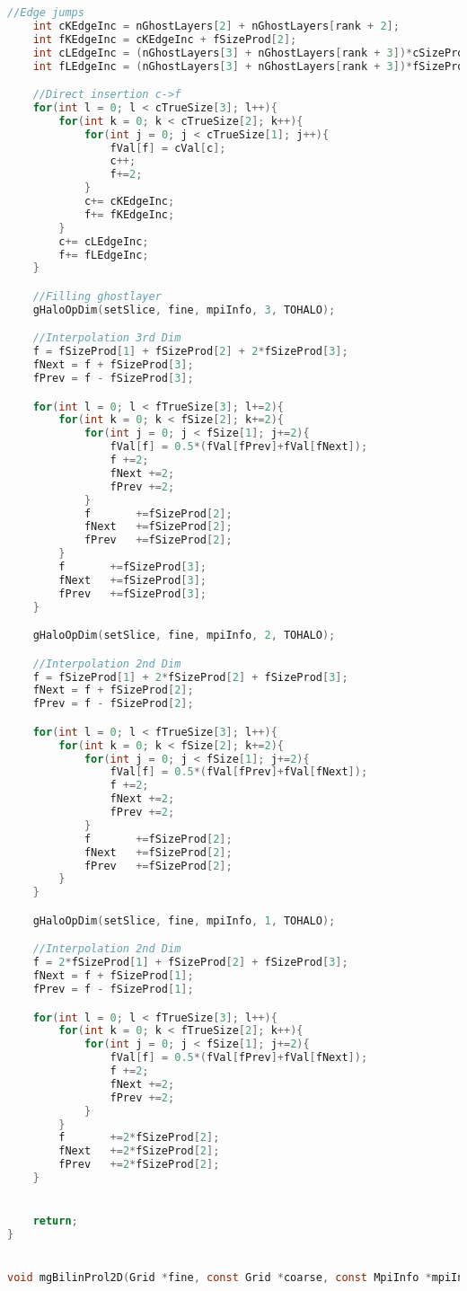 \begin{lstlisting}[language=c, caption = main routine]
	//Edge jumps
	int cKEdgeInc = nGhostLayers[2] + nGhostLayers[rank + 2];
	int fKEdgeInc = cKEdgeInc + fSizeProd[2];
	int cLEdgeInc = (nGhostLayers[3] + nGhostLayers[rank + 3])*cSizeProd[2];
	int fLEdgeInc = (nGhostLayers[3] + nGhostLayers[rank + 3])*fSizeProd[2] + fSizeProd[3];

	//Direct insertion c->f
	for(int l = 0; l < cTrueSize[3]; l++){
		for(int k = 0; k < cTrueSize[2]; k++){
			for(int j = 0; j < cTrueSize[1]; j++){
				fVal[f] = cVal[c];
				c++;
				f+=2;
			}
			c+= cKEdgeInc;
			f+= fKEdgeInc;
		}
		c+= cLEdgeInc;
		f+= fLEdgeInc;
	}

	//Filling ghostlayer
	gHaloOpDim(setSlice, fine, mpiInfo, 3, TOHALO);

	//Interpolation 3rd Dim
	f = fSizeProd[1] + fSizeProd[2] + 2*fSizeProd[3];
	fNext = f + fSizeProd[3];
	fPrev = f - fSizeProd[3];

	for(int l = 0; l < fTrueSize[3]; l+=2){
		for(int k = 0; k < fSize[2]; k+=2){
			for(int j = 0; j < fSize[1]; j+=2){
				fVal[f] = 0.5*(fVal[fPrev]+fVal[fNext]);
				f +=2;
				fNext +=2;
				fPrev +=2;
			}
			f		+=fSizeProd[2];
			fNext 	+=fSizeProd[2];
			fPrev 	+=fSizeProd[2];
		}
		f		+=fSizeProd[3];
		fNext 	+=fSizeProd[3];
		fPrev 	+=fSizeProd[3];
	}

	gHaloOpDim(setSlice, fine, mpiInfo, 2, TOHALO);

	//Interpolation 2nd Dim
	f = fSizeProd[1] + 2*fSizeProd[2] + fSizeProd[3];
	fNext = f + fSizeProd[2];
	fPrev = f - fSizeProd[2];

	for(int l = 0; l < fTrueSize[3]; l++){
		for(int k = 0; k < fSize[2]; k+=2){
			for(int j = 0; j < fSize[1]; j+=2){
				fVal[f] = 0.5*(fVal[fPrev]+fVal[fNext]);
				f +=2;
				fNext +=2;
				fPrev +=2;
			}
			f		+=fSizeProd[2];
			fNext 	+=fSizeProd[2];
			fPrev 	+=fSizeProd[2];
		}
	}

	gHaloOpDim(setSlice, fine, mpiInfo, 1, TOHALO);

	//Interpolation 2nd Dim
	f = 2*fSizeProd[1] + fSizeProd[2] + fSizeProd[3];
	fNext = f + fSizeProd[1];
	fPrev = f - fSizeProd[1];

	for(int l = 0; l < fTrueSize[3]; l++){
		for(int k = 0; k < fTrueSize[2]; k++){
			for(int j = 0; j < fSize[1]; j+=2){
				fVal[f] = 0.5*(fVal[fPrev]+fVal[fNext]);
				f +=2;
				fNext +=2;
				fPrev +=2;
			}
		}
		f		+=2*fSizeProd[2];
		fNext 	+=2*fSizeProd[2];
		fPrev 	+=2*fSizeProd[2];
	}


	return;
}


void mgBilinProl2D(Grid *fine, const Grid *coarse, const MpiInfo *mpiInfo){


\end{lstlisting}
